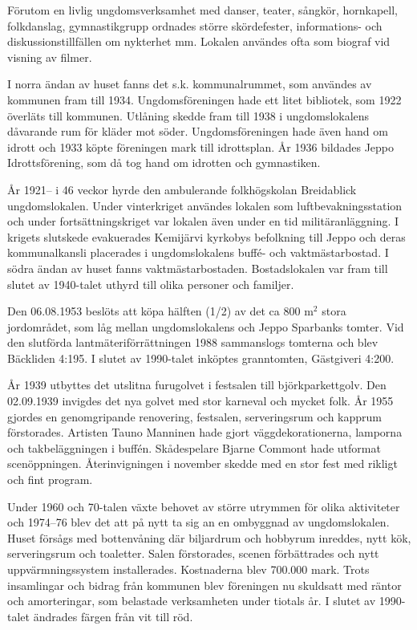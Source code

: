 Förutom en livlig ungdomsverksamhet med danser, teater, sångkör, hornkapell, folkdanslag, gymnastikgrupp ordnades större skördefester, informations- och diskussionstillfällen om nykterhet mm. Lokalen användes ofta som biograf vid visning av filmer.

I norra ändan av huset fanns det s.k. kommunalrummet, som användes av kommunen fram till 1934. Ungdomsföreningen hade ett litet bibliotek, som 1922 överläts till kommunen. Utlåning skedde fram till 1938 i ungdomslokalens dåvarande rum för kläder mot söder. Ungdomsföreningen hade även hand om idrott och 1933 köpte föreningen mark till idrottsplan. År 1936 bildades Jeppo Idrottsförening, som då tog hand om idrotten och gymnastiken.

År 1921-- i 46 veckor hyrde den ambulerande folkhögskolan Breidablick ungdomslokalen. Under vinterkriget användes lokalen som luftbevakningsstation och under fortsättningskriget var lokalen även under en tid militäranläggning. I krigets slutskede evakuerades Kemijärvi kyrkobys befolkning till Jeppo och deras kommunalkansli placerades i ungdomslokalens buffé- och vaktmästarbostad. I södra ändan av huset fanns vaktmästarbostaden. Bostadslokalen var fram till slutet av 1940-talet uthyrd till olika personer och familjer.


Den 06.08.1953 beslöts att köpa hälften (1/2) av det ca 800 m$^2$ stora jordområdet, som låg mellan ungdomslokalens och Jeppo Sparbanks tomter. Vid den slutförda lantmäteriförrättningen 1988 sammanslogs tomterna och blev Bäckliden 4:195. I slutet av 1990-talet inköptes granntomten, Gästgiveri 4:200.

År 1939 utbyttes det utslitna furugolvet i festsalen till björkparkettgolv. Den 02.09.1939 invigdes det nya golvet med stor karneval och mycket folk. År 1955 gjordes en genomgripande renovering, festsalen, serveringsrum och kapprum förstorades. Artisten Tauno Manninen hade gjort väggdekorationerna, lamporna och takbeläggningen i buffén. Skådespelare Bjarne Commont hade utformat scenöppningen. Återinvigningen i november skedde med en stor fest med rikligt och fint program.

Under 1960 och 70-talen växte behovet av större utrymmen för olika aktiviteter och 1974--76 blev det att på nytt ta sig an en ombyggnad av ungdomslokalen. Huset försågs med bottenvåning där biljardrum och hobbyrum inreddes, nytt kök, serveringsrum och toaletter. Salen förstorades, scenen förbättrades och nytt uppvärmningssystem installerades. Kostnaderna blev 700.000 mark. Trots insamlingar och bidrag från kommunen blev föreningen nu skuldsatt med räntor och amorteringar, som belastade verksamheten under tiotals år. I slutet av 1990-talet ändrades färgen från vit till röd.


